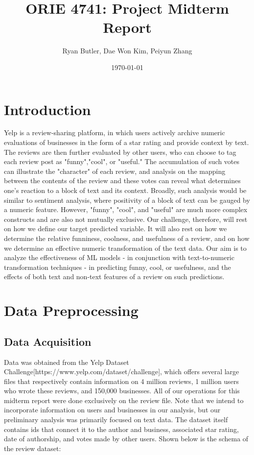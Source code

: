 \documentclass{article}
\title{ORIE 4741: Project Midterm Report}
\author{Ryan Butler, Dae Won Kim, Peiyun Zhang}
\date{\today}
\begin{document}
\maketitle

\section{Introduction}
Yelp is a review-sharing platform, in which users actively archive numeric evaluations of businesses in the form of a star rating and provide context by text. The reviews are then further evaluated by other users, who can choose to tag each review post as "funny","cool", or "useful." The accumulation of such votes can illustrate the "character" of each review, and analysis on the mapping between the contents of the review and these votes can reveal what determines one's reaction to a block of text and its context. Broadly, such analysis would be similar to sentiment analysis, where positivity of a block of text can be gauged by a numeric feature. However, "funny", "cool", and "useful" are much more complex constructs and are also not mutually exclusive. Our challenge, therefore, will rest on how we define our target predicted variable. It will also rest on how we determine the relative funniness, coolness, and usefulness of a review, and on how we determine an effective numeric transformation of the text data. Our aim is to analyze the effectiveness of ML models - in conjunction with text-to-numeric transformation techniques - in predicting funny, cool, or usefulness, and the effects of both text and non-text features of a review on such predictions. 

\section{Data Preprocessing}
\subsection{Data Acquisition}
Data was obtained from the Yelp Dataset Challenge[https://www.yelp.com/dataset/challenge], which offers several large files that respectively contain information on 4 million reviews, 1 million users who wrote these reviews, and 150,000 businesses. All of our operations for this midterm report were done exclusively on the review file. Note that we intend to incorporate information on users and businesses in our analysis, but our preliminary analysis was primarily focused on text data. The dataset itself contains ids that connect it to the author and business, associated star rating, date of authorship, and votes made by other users. Shown below is the schema of the review dataset: 
\end{document}
